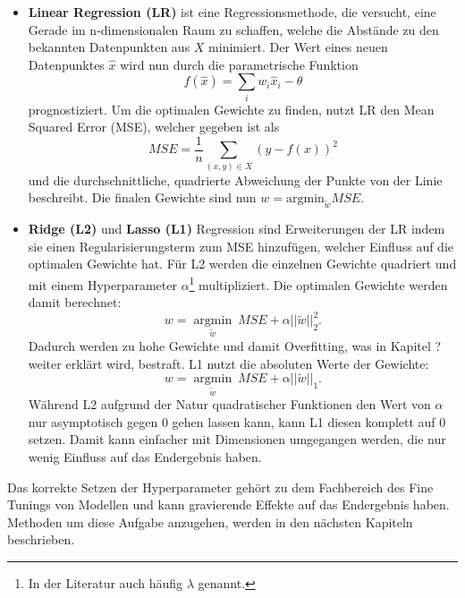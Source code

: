 \begin{itemize}
   \item \textbf{Linear Regression (LR)} ist eine Regressionsmethode, die versucht, eine Gerade im
    n-dimensionalen Raum zu schaffen, welche die Abstände zu den bekannten Datenpunkten aus $X$ minimiert. Der
    Wert eines neuen Datenpunktes $\hat{x}$ wird nun durch die parametrische Funktion
    \begin{equation}
        f(\hat{x}) = \sum_i w_i\hat{x}_i - \theta
    \end{equation}
    prognostiziert. Um die optimalen Gewichte zu finden, nutzt LR den Mean
    Squared Error (MSE), welcher gegeben ist als
    \begin{equation}
        MSE = \frac{1}{n} \sum_{(x,y) \in X}(y-f(x))^2
    \end{equation}
    und die durchschnittliche, quadrierte Abweichung der Punkte von der Linie beschreibt. Die finalen
    Gewichte sind nun $w = \text{argmin}_{\tilde{w}} MSE$.

   \item \textbf{Ridge (L2)} und \textbf{Lasso (L1)} Regression sind Erweiterungen der LR indem sie einen
    Regularisierungsterm zum MSE hinzufügen, welcher Einfluss auf die optimalen Gewichte hat. Für L2 werden
    die einzelnen Gewichte quadriert und mit einem Hyperparameter $\alpha$\footnote{In der Literatur auch
    häufig $\lambda$ genannt.} multipliziert. Die optimalen Gewichte werden
    damit berechnet: 
    \begin{equation}
        w = \underset{\tilde{w}}{\operatorname{argmin}}\ MSE + \alpha||\tilde{w}||_2^2.
    \end{equation}
    Dadurch werden zu hohe Gewichte und damit Overfitting, was in Kapitel ? weiter erklärt wird, bestraft.
    L1 nutzt die absoluten Werte der Gewichte:
    \begin{equation}
        w = \underset{\tilde{w}}{\operatorname{argmin}}\ MSE + \alpha||\tilde{w}||_1.
    \end{equation}
    Während L2 aufgrund der Natur quadratischer Funktionen den Wert von $\alpha$ nur asymptotisch gegen $0$ gehen
    lassen kann, kann L1 diesen komplett auf $0$ setzen. Damit kann einfacher mit Dimensionen umgegangen werden,
    die nur wenig Einfluss auf das Endergebnis haben.

\end{itemize}

Das korrekte Setzen der Hyperparameter gehört zu dem Fachbereich des Fine Tunings von Modellen und kann
 gravierende Effekte auf das Endergebnis haben. Methoden um diese Aufgabe anzugehen, werden in den
 nächsten Kapiteln beschrieben.


